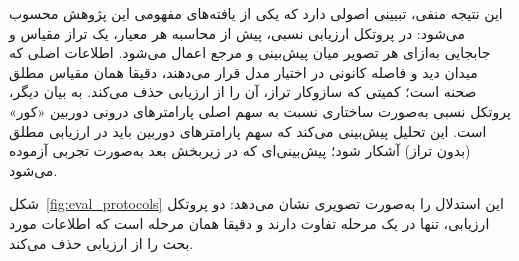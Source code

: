 این نتیجه منفی، تبیینی اصولی دارد که یکی از یافته‌های مفهومی این پژوهش محسوب می‌شود: در پروتکل ارزیابی نسبی، پیش از محاسبه هر معیار، یک تراز مقیاس و جابجایی به‌ازای هر تصویر میان پیش‌بینی و مرجع اعمال می‌شود. اطلاعات اصلی که میدان دید و فاصله کانونی در اختیار مدل قرار می‌دهند، دقیقا همان مقیاس مطلق صحنه است؛ کمیتی که سازوکار تراز، آن را از ارزیابی حذف می‌کند. به بیان دیگر، پروتکل نسبی به‌صورت ساختاری نسبت به سهم اصلی پارامترهای درونی دوربین «کور» است. این تحلیل پیش‌بینی می‌کند که سهم پارامترهای دوربین باید در ارزیابی مطلق (بدون تراز) آشکار شود؛ پیش‌بینی‌ای که در زیربخش بعد به‌صورت تجربی آزموده می‌شود.

شکل~\ref{fig:eval_protocols} این استدلال را به‌صورت تصویری نشان می‌دهد:
دو پروتکل ارزیابی، تنها در یک مرحله تفاوت دارند و دقیقا همان مرحله است که
اطلاعات مورد بحث را از ارزیابی حذف می‌کند.


